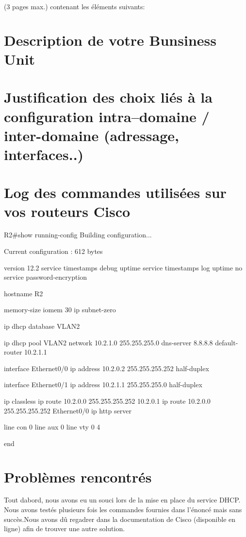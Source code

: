 \documentclass{article}
\author{Benjamain André\\Alexis Lecocp\\Arnaud Collin\\Waelkens Dimitri}
\begin{document}
\Rapport (3 pages max.) contenant les éléments suivants:

\section{Description de votre Bunsiness Unit}

\section{Justification des choix liés à la configuration intra--domaine / inter-domaine (adressage, interfaces..)}

\section{Log des commandes utilisées sur vos routeurs Cisco}

R2#show running-config
Building configuration...

Current configuration : 612 bytes

version 12.2
service timestamps debug uptime
service timestamps log uptime
no service password-encryption

hostname R2

memory-size iomem 30
ip subnet-zero

ip dhcp database VLAN2

ip dhcp pool VLAN2
   network 10.2.1.0 255.255.255.0
   dns-server 8.8.8.8
   default-router 10.2.1.1

interface Ethernet0/0
 ip address 10.2.0.2 255.255.255.252
 half-duplex

interface Ethernet0/1
 ip address 10.2.1.1 255.255.255.0
 half-duplex

ip classless
ip route 10.2.0.0 255.255.255.252 10.2.0.1
ip route 10.2.0.0 255.255.255.252 Ethernet0/0
ip http server

line con 0
line aux 0
line vty 0 4

end

\section{Problèmes rencontrés}

Tout dabord, nous avons eu un souci lors de la mise en place du service DHCP. Nous avons testés
plusieurs fois les commandes fournies dans l'énoncé mais sans succès.Nous avons dû regadrer dans 
la documentation de Cisco (disponible en ligne) afin de trouver une autre solution.
\end{document}
